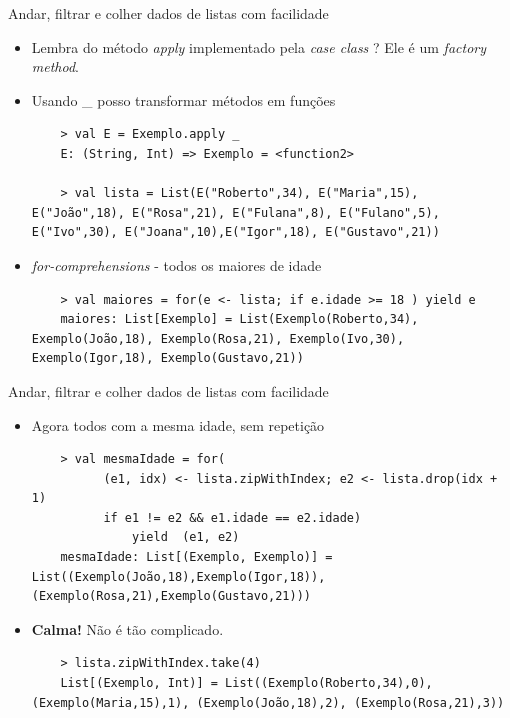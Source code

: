 \documentclass{beamer}
\begin{document}
\begin{frame}[fragile]{Andar, filtrar e colher dados de listas com facilidade} 
    \begin{itemize} %
    \item<1-> Lembra do método \emph{apply} implementado pela \emph{case class} ? Ele é um \emph{factory method}.
    \item<1-> Usando \_ posso transformar métodos em funções
    
	\begin{lstlisting}
	> val E = Exemplo.apply _
	E: (String, Int) => Exemplo = <function2>
	
	> val lista = List(E("Roberto",34), E("Maria",15), E("João",18), E("Rosa",21), E("Fulana",8), E("Fulano",5), E("Ivo",30), E("Joana",10),E("Igor",18), E("Gustavo",21))
	\end{lstlisting}
	
	\item<2-> \emph{for-comprehensions} - todos os maiores de idade
	
	\begin{lstlisting}
	> val maiores = for(e <- lista; if e.idade >= 18 ) yield e
	maiores: List[Exemplo] = List(Exemplo(Roberto,34), Exemplo(João,18), Exemplo(Rosa,21), Exemplo(Ivo,30), Exemplo(Igor,18), Exemplo(Gustavo,21))	
	\end{lstlisting}
    \end{itemize}
\end{frame}

\begin{frame}[fragile]{Andar, filtrar e colher dados de listas com facilidade} 
    \begin{itemize} [<+->]
	\item Agora todos com a mesma idade, sem repetição
	\begin{lstlisting}
	> val mesmaIdade = for(
	      (e1, idx) <- lista.zipWithIndex; e2 <- lista.drop(idx + 1)
	      if e1 != e2 && e1.idade == e2.idade) 
	          yield  (e1, e2)
	mesmaIdade: List[(Exemplo, Exemplo)] = List((Exemplo(João,18),Exemplo(Igor,18)), (Exemplo(Rosa,21),Exemplo(Gustavo,21)))
	\end{lstlisting}

	\item \textbf{Calma!} Não é tão complicado.
	\begin{lstlisting}
	> lista.zipWithIndex.take(4)
	List[(Exemplo, Int)] = List((Exemplo(Roberto,34),0), (Exemplo(Maria,15),1), (Exemplo(João,18),2), (Exemplo(Rosa,21),3))
	\end{lstlisting}
    \end{itemize}
\end{frame}
\end{document}
